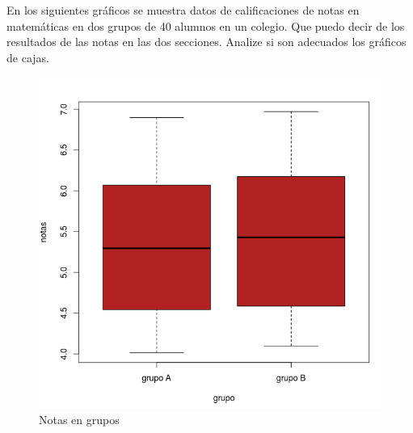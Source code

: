 \documentclass[11pt,evaluacion]{uescimat}
\begin{document}
\begin{problema}
En los siguientes gráficos se muestra datos de calificaciones de notas en matemáticas en dos grupos de 40 alumnos en un colegio. Que puedo decir de los resultados de las notas en las dos secciones. Analize si son adecuados los gráficos de cajas. 


\begin{figure}[H]
\begin{centering}
\includegraphics[scale=0.30]{imagen7.png}
\par\end{centering}
\caption{Notas en grupos}
\end{figure}


\end{problema}
\end{document}
